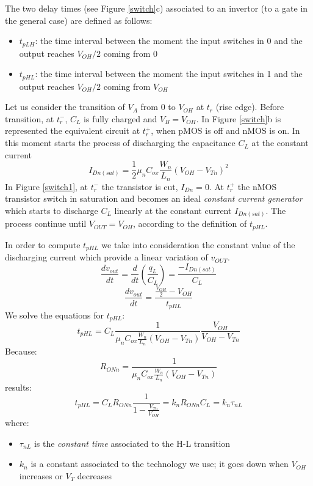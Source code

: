 The two delay times (see Figure \ref{switch}c) associated to an invertor
(to a gate in the general case) are defined as follows:
\begin{itemize}
    \item $t_{pLH}$: the time interval between the moment the input
    switches in 0 and the output reaches $V_{OH}/2$ coming from 0
    \item $t_{pHL}$: the time interval between the moment the input
    switches in 1 and the output reaches $V_{OH}/2$ coming from $V_{OH}$
\end{itemize}

Let us consider the transition of $V_A$ from 0 to $V_{OH}$ at $t_r$ (rise edge). Before transition, at $t_r^-$, $C_L$ is fully charged and $V_B = V_{OH}$. In Figure \ref{switch}b is represented the equivalent circuit at $t_r^+$, when pMOS is off and nMOS is on. In this moment starts the process of discharging  the capacitance $C_L$ at the constant current
$$I_{Dn(sat)} = \frac{1}{2} \mu_n C_{ox} \frac{W_n}{L_n} (V_{OH} - V_{Tn})^2$$
In Figure \ref{switch1}, at $t_r^-$ the transistor is cut, $I_{Dn} = 0$. At $t_r^+$ the  nMOS transistor switch in saturation and becomes an ideal {\em constant current generator} which starts to discharge $C_L$ linearly at the constant current $I_{Dn(sat)}$. The process continue until $V_{OUT} = V_{OH}$, according to the definition of $t_{pHL}$.



In order to compute $t_{pHL}$ we take into consideration the constant value of the discharging current which provide a linear variation of $v_{OUT}$.
$$\frac{dv_{out}}{dt} = \frac{d}{dt}(\frac{q_L}{C_L}) = \frac{-I_{Dn(sat)}}{C_L}$$
$$\frac{dv_{out}}{dt} = \frac{\frac{V_{OH}}{2} - V_{OH}}{t_{pHL}}$$
We solve the equations for $t_{pHL}$:
$$t_{pHL} = C_L \frac{1}{\mu_n C_{ox} \frac{W_n}{L_n} (V_{OH} - V_{Tn})} \frac{V_{OH}}{V_{OH} - V_{Tn}}$$
Because:
$$R_{ONn} = \frac{1}{\mu_n C_{ox} \frac{W_n}{L_n} (V_{OH} - V_{Tn})}$$
results:
$$t_{pHL} = C_L R_{ONn} \frac{1}{1 - \frac{V_{Tn}}{V_{OH}}} = k_n R_{ONn} C_L = k_n \tau_{nL} $$
where:
\begin{itemize}
\item $\tau_{nL}$ is the {\em constant time} associated to the H-L transition
\item $k_n$ is a constant associated to the technology we use; it goes down when $V_{OH}$ increases or $V_T$ decreases
\end{itemize}

